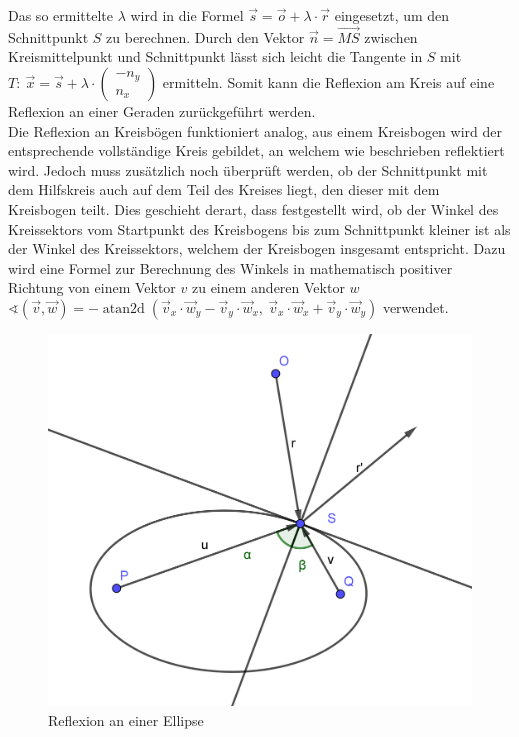 \documentclass[reducespace,stylepage,semiarbeit]{spezidoc}
\DeclareMathOperator{\atantwo}{atan2d}
\begin{document}
Das so ermittelte $\lambda$ wird in die Formel $\vec{s} = \vec{o} + \lambda \cdot \vec{r}$  eingesetzt, um den Schnittpunkt $S$ zu berechnen. 
Durch den Vektor $\vec{n} = \vec{MS}$ zwischen Kreismittelpunkt und Schnittpunkt lässt sich leicht die Tangente in $S$ mit $T: ~\vec{x} = \vec{s} + \lambda \cdot \begin{pmatrix} -n_y \\ n_x \end{pmatrix}$ ermitteln.
Somit kann die Reflexion am Kreis auf eine Reflexion an einer Geraden zurückgeführt werden.\\
Die Reflexion an Kreisbögen funktioniert analog, aus einem Kreisbogen wird der entsprechende vollständige Kreis gebildet, an welchem wie beschrieben reflektiert wird. 
Jedoch muss zusätzlich noch überprüft werden, ob der Schnittpunkt mit dem \glqq Hilfskreis\grqq{} auch auf dem Teil des Kreises liegt, den dieser mit dem Kreisbogen teilt. 
Dies geschieht derart, dass festgestellt wird, ob der Winkel des Kreissektors vom Startpunkt des Kreisbogens bis zum Schnittpunkt kleiner ist als der Winkel des Kreissektors, welchem der Kreisbogen insgesamt entspricht. 
Dazu wird eine Formel zur Berechnung des Winkels in mathematisch positiver Richtung von einem Vektor $v$ zu einem anderen Vektor $w$ $\sphericalangle(\vec{v}, \vec{w}) = -\atantwo(\vec{v}_x\cdot\vec{w}_y-\vec{v}_y\cdot\vec{w}_x,~\vec{v}_x\cdot\vec{w}_x+\vec{v}_y\cdot\vec{w}_y)$  verwendet.
\par
\begin{figure}
\includegraphics[scale=0.7]{pictures/OvalRef.png}
\caption{Reflexion an einer Ellipse}
\label{fig:Ellipse}
\end{figure}
\end{document}
